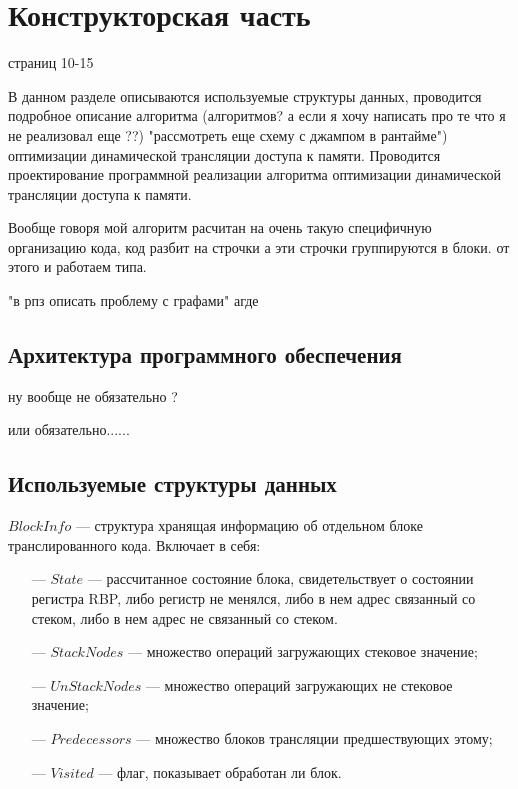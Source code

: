 \section{Конструкторская часть}

страниц 10-15

В данном разделе описываются используемые структуры данных, проводится
подробное описание алгоритма (алгоритмов? а если я хочу написать про те что я не реализовал еще ??) "рассмотреть еще схему с джампом в рантайме") оптимизации динамической трансляции доступа к памяти. Проводится проектирование программной реализации алгоритма оптимизации динамической трансляции доступа к памяти.

Вообще говоря мой алгоритм расчитан на очень такую специфичную организацию кода, код разбит на строчки а эти строчки группируются в блоки. от этого и работаем типа.

"в рпз описать проблему с графами" агде

\subsection{Архитектура программного обеспечения}

ну вообще не обязательно ?

или обязательно...... 

\subsection{Используемые структуры данных}

$BlockInfo$ --- структура хранящая информацию об отдельном блоке транслированного кода. Включает в себя:

\begin{itemize}[leftmargin=1.6\parindent]
	\item[---] $State$ --- рассчитанное состояние блока, свидетельствует о состоянии регистра RBP, либо регистр не менялся, либо в нем адрес связанный со стеком, либо в нем адрес не связанный со стеком.
	\item[---] $StackNodes$ --- множество операций загружающих стековое значение;
	\item[---] $UnStackNodes$ --- множество операций загружающих не стековое значение;
	\item[---] $Predecessors$ --- множество блоков трансляции предшествующих этому;
	\item[---] $Visited$ --- флаг, показывает обработан ли блок.
\end{itemize}


